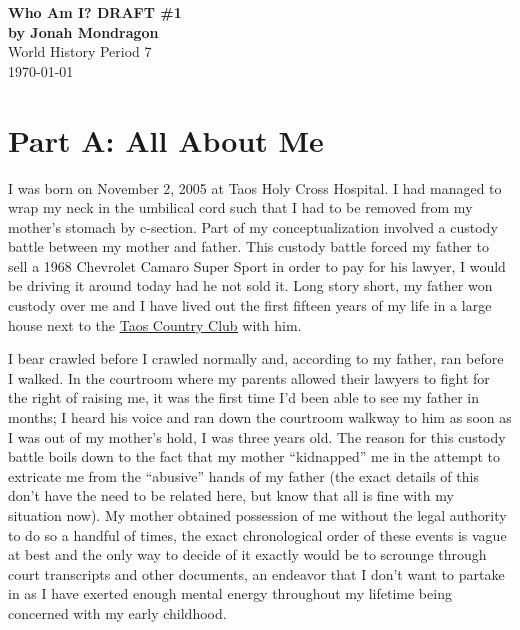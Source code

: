 \documentclass[12pt]{article}
\begin{document}
\doublespacing

\begin{titlepage}
    \begin{center}
        \vspace*{1.5in}
        {\huge\bfseries{Who Am I? DRAFT \#1}}\\
            {\bfseries{by Jonah Mondragon}}\\
            World History Period 7\\
            \today
    \end{center}
\end{titlepage}

\section*{Part A: All About Me}

I was born on November 2, 2005 at Taos Holy Cross Hospital.
I had managed to wrap my neck in the umbilical cord such that I had to be removed from my 
    mother's stomach by c-section.
Part of my conceptualization involved a custody battle between my mother and father.
This custody battle forced my father to sell a 1968 Chevrolet Camaro Super Sport
    in order to pay for his lawyer, I would be driving it around today had he not sold it.
Long story short, my father won custody over me and I have lived out the first fifteen years of my 
    life in a large house next to the {\color{blue}\underline{\href{https://www.taoscountryclub.com/}{Taos Country Club}}} with him.

I bear crawled before I crawled normally and, according to my father, ran before I walked.
In the courtroom where my parents allowed their lawyers to fight for the right of raising me,
    it was the first time I'd been able to see my father in months; %
    I heard his voice and ran down the courtroom walkway to him as soon as I was out of 
    my mother's hold, I was three years old. %
The reason for this custody battle boils down to the fact that my mother ``kidnapped'' me in the
    attempt to extricate me from the ``abusive'' hands of my father (the exact details of this don't
    have the need to be related here, but know that all is fine with my situation now).
My mother obtained possession of me without the legal authority to do so a handful of times, the
    exact chronological order of these events is vague at best and the only way to decide of it
    exactly would be to scrounge through court transcripts and other documents, an endeavor
    that I don't want to partake in as I have exerted enough mental energy throughout my lifetime
    being concerned with my early childhood.
\end{document}
